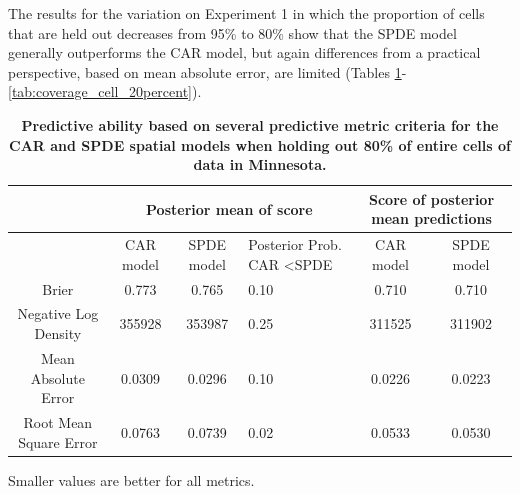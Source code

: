 \documentclass[10pt,letterpaper]{article}
\begin{document}
The results for the variation on Experiment 1 in which the proportion
of cells that are held out decreases from 95\% to 80\% show that the
SPDE model generally outperforms the CAR model, but again differences
from a practical perspective, based on mean absolute error, are limited
(Tables \ref{tab:score_cell_20percent}-\ref{tab:coverage_cell_20percent}). 




\begin{table}
\begin{adjustwidth}{-2.25in}{0in}
\caption{{\bf Predictive ability based on several predictive metric criteria for
the CAR and SPDE spatial models when holding out 80\% of entire cells
of data in Minnesota.}}


\begin{tabular}{|c|c|c|>{\centering}p{3cm}|c|c|}
\hline 
 &
\multicolumn{3}{c|}{{\small{}Posterior mean of score}} &
\multicolumn{2}{c|}{{\small{}Score of posterior mean predictions}}\tabularnewline
\hline 
\hline 
 &
{\small{}CAR model} &
{\small{}SPDE model} &
{\small{}Posterior Prob. CAR \textless  SPDE} &
{\small{}CAR model} &
{\small{}SPDE model}\tabularnewline
\hline 
{\small{}Brier} &
{\small{}0.773} &
{\small{}0.765} &
{\small{}0.10} &
{\small{}0.710} &
{\small{}0.710}\tabularnewline
\hline 
{\small{}Negative Log Density} &
{\small{}355928} &
{\small{}353987} &
{\small{}0.25} &
{\small{}311525} &
{\small{}311902}\tabularnewline
\hline 
{\small{}Mean Absolute Error} &
{\small{}0.0309} &
{\small{}0.0296} &
{\small{}0.10} &
{\small{}0.0226} &
{\small{}0.0223}\tabularnewline
\hline 
{\small{}Root Mean Square Error} &
{\small{}0.0763} &
{\small{}0.0739} &
{\small{}0.02} &
{\small{}0.0533} &
{\small{}0.0530}\tabularnewline
\hline 
\end{tabular}
\begin{flushleft}
 Smaller values are better for all metrics.
\end{flushleft}

\label{tab:score_cell_20percent}
\end{adjustwidth}
\end{table}
\end{document}
